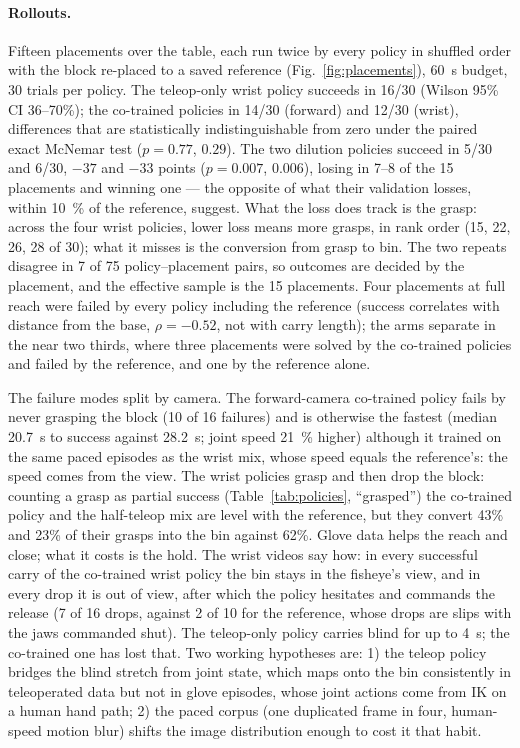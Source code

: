 \documentclass{article}
\begin{document}
\paragraph{Rollouts.}
Fifteen placements over the table, each run twice by every policy in shuffled order with the block re-placed to a saved reference (Fig.~\ref{fig:placements}), \SI{60}{s} budget, 30 trials per policy. The teleop-only wrist policy succeeds in 16/30 (Wilson 95\% CI 36--70\%); the co-trained policies in 14/30 (forward) and 12/30 (wrist), differences that are statistically indistinguishable from zero under the paired exact McNemar test ($p=0.77$, $0.29$). The two dilution policies succeed in 5/30 and 6/30, $-37$ and $-33$ points ($p=0.007$, $0.006$), losing in 7--8 of the 15 placements and winning one --- the opposite of what their validation losses, within \SI{10}{\percent} of the reference, suggest. What the loss does track is the grasp: across the four wrist policies, lower loss means more grasps, in rank order (15, 22, 26, 28 of 30); what it misses is the conversion from grasp to bin. The two repeats disagree in 7 of 75 policy--placement pairs, so outcomes are decided by the placement, and the effective sample is the 15 placements. Four placements at full reach were failed by every policy including the reference (success correlates with distance from the base, $\rho=-0.52$, not with carry length); the arms separate in the near two thirds, where three placements were solved by the co-trained policies and failed by the reference, and one by the reference alone.

The failure modes split by camera. The forward-camera co-trained policy fails by never grasping the block (10 of 16 failures) and is otherwise the fastest (median \SI{20.7}{s} to success against \SI{28.2}{s}; joint speed \SI{21}{\percent} higher) although it trained on the same paced episodes as the wrist mix, whose speed equals the reference's: the speed comes from the view. The wrist policies grasp and then drop the block: counting a grasp as partial success (Table~\ref{tab:policies}, ``grasped'') the co-trained policy and the half-teleop mix are level with the reference, but they convert 43\% and 23\% of their grasps into the bin against 62\%. Glove data helps the reach and close; what it costs is the hold. The wrist videos say how: in every successful carry of the co-trained wrist policy the bin stays in the fisheye's view, and in every drop it is out of view, after which the policy hesitates and commands the release (7 of 16 drops, against 2 of 10 for the reference, whose drops are slips with the jaws commanded shut). The teleop-only policy carries blind for up to \SI{4}{s}; the co-trained one has lost that. Two working hypotheses are: 1) the teleop policy bridges the blind stretch from joint state, which maps onto the bin consistently in teleoperated data but not in glove episodes, whose joint actions come from IK on a human hand path; 2) the paced corpus (one duplicated frame in four, human-speed motion blur) shifts the image distribution enough to cost it that habit.
\end{document}
